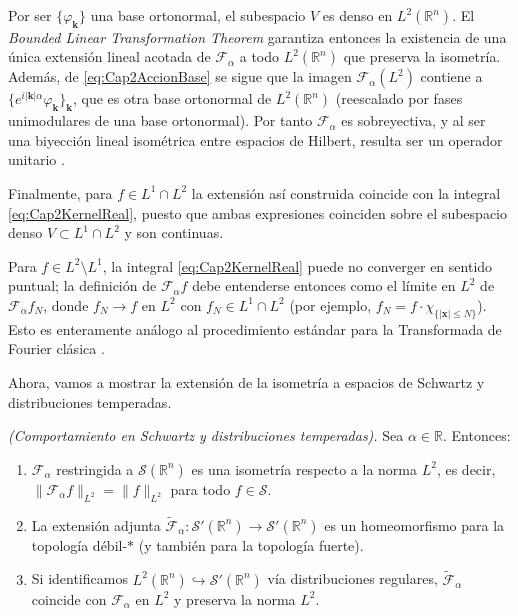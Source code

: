 \begin{Proof}
                Por ser $\{\varphi_{\boldsymbol{k}}\}$ una base ortonormal, el subespacio $V$ es denso en $L^2(\mathbb{R}^n)$. El \emph{Bounded Linear Transformation Theorem} \citep[Thm. I.7]{reed1980methods} garantiza entonces la existencia de una única extensión lineal acotada de $\mathcal{F}_\alpha$ a todo $L^2(\mathbb{R}^n)$ que preserva la isometría. Además, de \eqref{eq:Cap2AccionBase} se sigue que la imagen $\mathcal{F}_\alpha(L^2)$ contiene a $\{e^{i|\boldsymbol{k}|\alpha}\varphi_{\boldsymbol{k}}\}_{\boldsymbol{k}}$, que es otra base ortonormal de $L^2(\mathbb{R}^n)$ (reescalado por fases unimodulares de una base ortonormal). Por tanto $\mathcal{F}_\alpha$ es sobreyectiva, y al ser una biyección lineal isométrica entre espacios de Hilbert, resulta ser un operador unitario \citep[Thm. VI.2]{reed1980methods}.

                Finalmente, para $f \in L^1\cap L^2$ la extensión así construida coincide con la integral \eqref{eq:Cap2KernelReal}, puesto que ambas expresiones coinciden sobre el subespacio denso $V\subset L^1\cap L^2$ y son continuas.
            \end{Proof}
            
            \begin{remark}
                Para $f \in L^2\setminus L^1$, la integral \eqref{eq:Cap2KernelReal} puede no converger en sentido puntual; la definición de $\mathcal{F}_\alpha f$ debe entenderse entonces como el límite en $L^2$ de $\mathcal{F}_\alpha f_N$, donde $f_N \to f$ en $L^2$ con $f_N \in L^1\cap L^2$ (por ejemplo, $f_N = f\cdot \chi_{\{|\mathbf{x}|\leq N\}}$). Esto es enteramente análogo al procedimiento estándar para la Transformada de Fourier clásica \citep[Ch. 7]{grafakos2014classical}.
            \end{remark}

            Ahora, vamos a mostrar la extensión de la isometría a espacios de Schwartz y distribuciones temperadas.

            \begin{proposition}\label{prop:schwartz_sprima}
                \textit{(Comportamiento en Schwartz y distribuciones temperadas).} Sea $\alpha \in \mathbb{R}$. Entonces:
                \begin{enumerate}
                    \item $\mathcal{F}_\alpha$ restringida a $\mathcal{S}(\mathbb{R}^n)$ es una isometría respecto a la norma $L^2$, es decir, $\|\mathcal{F}_\alpha f\|_{L^2} = \|f\|_{L^2}$ para todo $f\in \mathcal{S}$.
                    \item La extensión adjunta $\tilde{\mathcal{F}}_\alpha : \mathcal{S}'(\mathbb{R}^n) \to \mathcal{S}'(\mathbb{R}^n)$ es un homeomorfismo para la topología débil-$*$ (y también para la topología fuerte).
                    \item Si identificamos $L^2(\mathbb{R}^n)\hookrightarrow \mathcal{S}'(\mathbb{R}^n)$ vía distribuciones regulares, $\tilde{\mathcal{F}}_\alpha$ coincide con $\mathcal{F}_\alpha$ en $L^2$ y preserva la norma $L^2$.
                \end{enumerate}
            \end{proposition}
            
